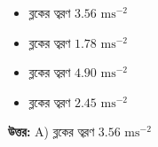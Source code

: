 \documentclass[12pt, a4paper]{article}
\begin{document}
\begin{itemize}[label={}, leftmargin=1cm, itemsep=0.5em]
    \item[\textbf{A)}] ব্লকের ত্বরণ $3.56\text{ ms}^{-2}$
    \item[\textbf{B)}] ব্লকের ত্বরণ $1.78\text{ ms}^{-2}$
    \item[\textbf{C)}] ব্লকের ত্বরণ $4.90\text{ ms}^{-2}$
    \item[\textbf{D)}] ব্লকের ত্বরণ $2.45\text{ ms}^{-2}$
\end{itemize}

\vspace{0.5em}
\begin{tcolorbox}[answerbox]
    \textbf{\color{success} উত্তর:} A) ব্লকের ত্বরণ $3.56\text{ ms}^{-2}$
\end{tcolorbox}
\vspace{1em}
\end{document}
